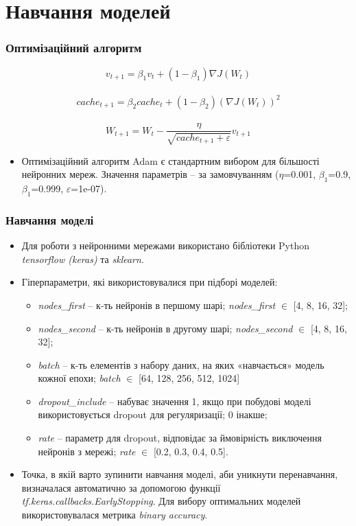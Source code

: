 \documentclass[aspectratio=169]{beamer}
\begin{document}
\section{Навчання моделей}

\begin{frame}
\frametitle{Оптимізаційний алгоритм}
\[ v_{t+1} = \beta_{1} v_{t} + (1-\beta_{1})\nabla J(W_{t}) \]\\
\[ cache_{t+1} = \beta_{2} cache_{t} + (1-\beta_{2})(\nabla J(W_{t}))^{2} \]\\
\[ W_{t+1} = W_{t}-\frac{\eta}{\sqrt{cache_{t+1}+\varepsilon}}v_{t+1} \]
\bigskip
\begin{itemize}
\item \alert {Оптимізаційний алгоритм Adam} є стандартним вибором для більшості нейронних мереж. Значення параметрів – за замовчуванням ($\eta$=0.001, $\beta_{1}$=0.9, $\beta_{1}$=0.999, $\varepsilon$=1e-07). 
\end{itemize}
\end{frame}

\begin{frame}
\frametitle{Навчання моделі}
\begin{itemize}
\item \small Для роботи з нейронними мережами використано \alert {бібліотеки} Python \textit{tensorflow (keras)} та \textit{sklearn}.\\
\bigskip
\item \small \alert {Гіперпараметри}, які використовувалися при підборі моделей:\\
\begin{itemize}
\item[\textcolor{orange}{\textbullet}] \textit{nodes\_first} – к-ть нейронів в першому шарі; \textit{nodes\_first} $\in$ [4, 8, 16, 32];\\
\item[\textcolor{orange}{\textbullet}] \textit{nodes\_second} – к-ть нейронів в другому шарі; \textit{nodes\_second} $\in$ [4, 8, 16, 32];\\
\item[\textcolor{orange}{\textbullet}] \textit{batch} – к-ть елементів з набору даних, на яких «навчається» модель кожної епохи; \textit{batch} $\in$ [64, 128, 256, 512, 1024]\\ 
\item[\textcolor{orange}{\textbullet}] \textit{dropout\_include} – набуває значення 1, якщо при побудові моделі використовується dropout для регуляризації; 0 інакше;\\
\item[\textcolor{orange}{\textbullet}] \textit{rate} – параметр для dropout, відповідає за ймовірність виключення нейронів з мережі; \textit{rate} $\in$ [0.2, 0.3, 0.4, 0.5].\\
\bigskip
\end{itemize}
\item \small Точка, в якій варто зупинити навчання моделі, аби уникнути перенавчання, визначалася автоматично за допомогою функції \textit{tf.keras.callbacks.EarlyStopping}. Для вибору оптимальних моделей використовувалася метрика \textit{binary accuracy}. 
\end{itemize}
\end{frame}
\end{document}
